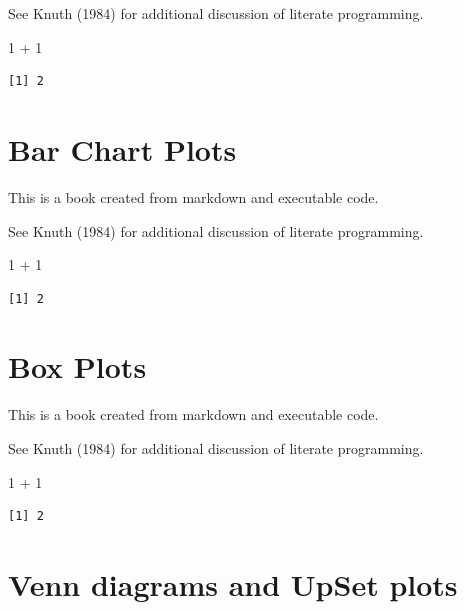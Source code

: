 \documentclass[
  letterpaper,
  DIV=11,
  numbers=noendperiod]{scrreprt}
\newenvironment{Shaded}{\begin{snugshade}}{\end{snugshade}}
\newcommand{\DecValTok}[1]{\textcolor[rgb]{0.68,0.00,0.00}{#1}}
\newcommand{\SpecialCharTok}[1]{\textcolor[rgb]{0.37,0.37,0.37}{#1}}
\begin{document}
See Knuth (1984) for additional discussion of literate programming.

\begin{Shaded}
\begin{Highlighting}[]
\DecValTok{1} \SpecialCharTok{+} \DecValTok{1}
\end{Highlighting}
\end{Shaded}

\begin{verbatim}
[1] 2
\end{verbatim}

\chapter{Bar Chart Plots}\label{bar-chart-plots}

This is a book created from markdown and executable code.

See Knuth (1984) for additional discussion of literate programming.

\begin{Shaded}
\begin{Highlighting}[]
\DecValTok{1} \SpecialCharTok{+} \DecValTok{1}
\end{Highlighting}
\end{Shaded}

\begin{verbatim}
[1] 2
\end{verbatim}

\chapter{Box Plots}\label{box-plots}

This is a book created from markdown and executable code.

See Knuth (1984) for additional discussion of literate programming.

\begin{Shaded}
\begin{Highlighting}[]
\DecValTok{1} \SpecialCharTok{+} \DecValTok{1}
\end{Highlighting}
\end{Shaded}

\begin{verbatim}
[1] 2
\end{verbatim}

\chapter{Venn diagrams and UpSet
plots}\label{venn-diagrams-and-upset-plots}
\end{document}
